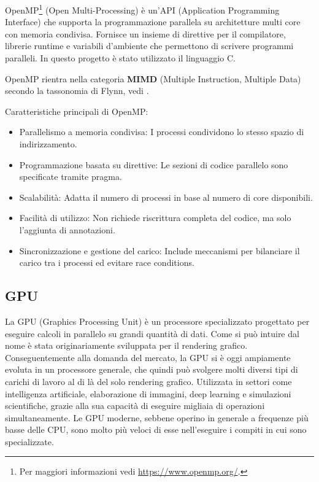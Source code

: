 \documentclass[12pt,a4paper]{report}
\begin{document}
OpenMP\footnote{Per maggiori informazioni vedi \url{https://www.openmp.org/}.} (Open Multi-Processing) è un'API (Application
Programming Interface) che supporta la programmazione parallela su architetture multi core con memoria condivisa.
Fornisce un insieme di direttive per il compilatore, librerie runtime e variabili d'ambiente che permettono di scrivere programmi
paralleli.
In questo progetto è stato utilizzato il linguaggio C.

OpenMP rientra nella categoria \textbf{MIMD} (Multiple Instruction, Multiple Data) secondo la tassonomia di Flynn, vedi
\cite{Flynn1966}.

Caratteristiche principali di OpenMP:
\begin{itemize}
  \item Parallelismo a memoria condivisa: I processi condividono lo stesso spazio di indirizzamento.
  \item Programmazione basata su direttive: Le sezioni di codice parallelo sono specificate tramite pragma.
  \item Scalabilità: Adatta il numero di processi in base al numero di core disponibili.
  \item Facilità di utilizzo: Non richiede riscrittura completa del codice, ma solo l'aggiunta di annotazioni.
  \item Sincronizzazione e gestione del carico: Include meccanismi per bilanciare il carico tra i processi ed evitare race
        conditions.
\end{itemize}

\subsection{GPU}

La GPU (Graphics Processing Unit) è un processore specializzato progettato per eseguire calcoli in parallelo su grandi quantità di
dati.
Come si può intuire dal nome è stata originariamente sviluppata per il rendering grafico.
Conseguentemente alla domanda del mercato, la GPU si è oggi ampiamente evoluta in un processore generale, che quindi può svolgere
molti diversi tipi di carichi di lavoro al di là del solo rendering grafico.
Utilizzata in settori come intelligenza artificiale, elaborazione di immagini, deep learning e simulazioni scientifiche, grazie
alla sua capacità di eseguire migliaia di operazioni simultaneamente.
Le GPU moderne, sebbene operino in generale a frequenze più basse delle CPU, sono molto più veloci di esse nell'eseguire i compiti
in cui sono specializzate.
\end{document}
